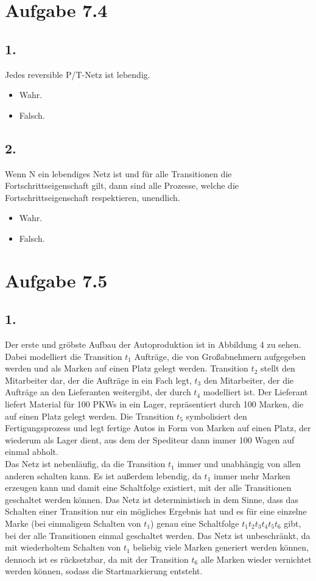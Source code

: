 \documentclass[12pt, paper=a4]{article}
\begin{document}
\newpage
\section*{Aufgabe 7.4}
\subsection*{1.}
Jedes reversible P/T-Netz ist lebendig.
\begin{itemize}
	\item Wahr.
	\item Falsch.
\end{itemize}
\subsection*{2.}

Wenn N ein lebendiges Netz ist und für alle Transitionen die Fortschrittseigenschaft
gilt, dann sind alle Prozesse, welche die Fortschrittseigenschaft respektieren,
unendlich.
\begin{itemize}
	\item Wahr.
	\item Falsch.
\end{itemize}

\section*{Aufgabe 7.5}
\subsection*{1.}
Der erste und gröbste Aufbau der Autoproduktion ist in Abbildung 4 zu sehen. Dabei modelliert die Transition $t_1$ Aufträge, die von Großabnehmern aufgegeben werden und als Marken auf einen Platz gelegt werden. Transition $t_2$ stellt den Mitarbeiter dar, der die Aufträge in ein Fach legt, $t_3$ den Mitarbeiter, der die Aufträge an den Lieferanten weitergibt, der durch $t_4$ modelliert ist. Der Lieferant liefert Material für 100 PKWs in ein Lager, repräsentiert durch 100 Marken, die auf einen Platz gelegt werden. Die Transition $t_5$ symbolisiert den Fertigungsprozess und legt fertige Autos in Form von Marken auf einen Platz, der wiederum als Lager dient, aus dem der Spediteur dann immer 100 Wagen auf einmal abholt.\\

Das Netz ist nebenläufig, da die Transition $t_1$ immer und unabhängig von allen anderen schalten kann. Es ist außerdem lebendig, da $t_1$ immer mehr Marken erzeugen kann und damit eine Schaltfolge existiert, mit der alle Transitionen geschaltet werden können. Das Netz ist deterministisch in dem Sinne, dass das Schalten einer Transition nur ein mögliches Ergebnis hat und es für eine einzelne Marke (bei einmaligem Schalten von $t_1$) genau eine Schaltfolge $t_1t_2t_3t_4t_5t_6$ gibt, bei der alle Transitionen einmal geschaltet werden. Das Netz ist unbeschränkt, da mit wiederholtem Schalten von $t_1$ beliebig viele Marken generiert werden können, dennoch ist es rücksetzbar, da mit der Transition $t_6$ alle Marken wieder vernichtet werden können, sodass die Startmarkierung entsteht.\\
\end{document}
